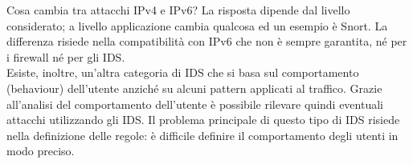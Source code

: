 Cosa cambia tra attacchi IPv4 e IPv6? La risposta dipende dal livello considerato; a livello applicazione cambia qualcosa ed un esempio è Snort. La differenza risiede nella compatibilità con IPv6 che non è sempre garantita, né per i firewall né per gli IDS.\\
Esiste, inoltre, un'altra categoria di IDS che si basa sul comportamento (behaviour) dell'utente anziché su alcuni pattern applicati al traffico. Grazie all'analisi del comportamento dell'utente è possibile rilevare quindi eventuali attacchi utilizzando gli IDS. Il problema principale di questo tipo di IDS risiede nella definizione delle regole: è difficile definire il comportamento degli utenti in modo preciso.
